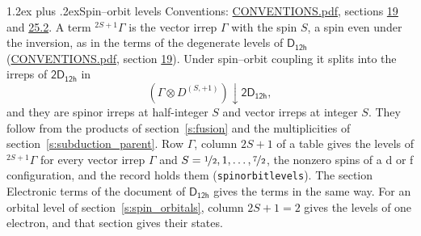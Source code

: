 \documentclass[10pt,a4paper]{article}
\makeatletter
\renewcommand\section{\@startsection{section}{1}{\z@}{-3ex plus -1ex minus -.2ex}%
  {1.2ex plus .2ex}{\normalfont\large\sffamily\bfseries\color{parttitle}}}
\numberwithin{equation}{section}
\newcommand{\grp}[1]{\mathsf{#1}}
\newcommand{\restr}[2]{#1\!\downarrow#2}
\newcommand{\irrJp}[2]{D^{(#1,#2)}}
\newcommand{\irrprod}{\otimes}
\newcommand{\term}[2]{{}^{#1}#2}
\makeatother
\begin{document}
\section{Spin--orbit levels}\label{s:spin_orbit}
Conventions: \href{../../CONVENTIONS.pdf}{CONVENTIONS.pdf}, sections \href{../../../rotation/CONVENTIONS.pdf\#conv.19}{19} and \href{../../CONVENTIONS.pdf\#conv.25.2}{25.2}.
\leavevmode\label{n:local.spin}\label{n:symbol.term}A term $\term{2S+1}{\Gamma}$ is the vector irrep $\Gamma$ with the spin $S$, a spin even under the inversion, as in the terms of the degenerate levels of \href{../../../rotation/data/pdf/D12h.pdf}{$\grp{D_{12h}}$} (\href{../../CONVENTIONS.pdf}{CONVENTIONS.pdf}, section \href{../../../rotation/CONVENTIONS.pdf\#conv.19}{19}). Under spin--orbit coupling it splits into the irreps of $\grp{2D_{12h}}$ in
\begin{equation}\label{e:spinorbit}\restr{(\Gamma \irrprod \irrJp{S}{+1})}{\grp{2D_{12h}}},\end{equation}
and they are spinor irreps at half-integer $S$ and vector irreps at integer $S$. They follow from the products of section~\ref{s:fusion} and the multiplicities of section~\ref{s:subduction_parent}. Row $\Gamma$, column $2S + 1$ of a table gives the levels of $\term{2S+1}{\Gamma}$ for every vector irrep $\Gamma$ and $S = \nicefrac{1}{2}, 1, \dots, \nicefrac{7}{2}$, the nonzero spins of a d or f configuration, and the record holds them (\texttt{spinorbitlevels}). The section Electronic terms of the document of \href{../../../rotation/data/pdf/D12h.pdf}{$\grp{D_{12h}}$} gives the terms in the same way. For an orbital level of section~\ref{s:spin_orbitals}, column $2S + 1 = 2$ gives the levels of one electron, and that section gives their states.
\end{document}
